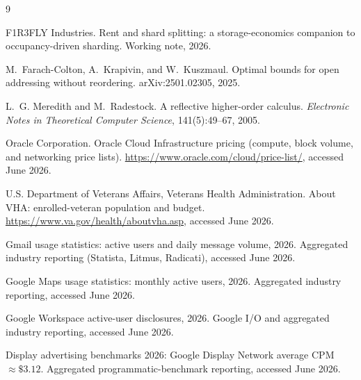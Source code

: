 \documentclass[11pt]{article}
\begin{document}
\begin{thebibliography}{9}

F1R3FLY Industries.
\newblock Rent and shard splitting: a storage-economics companion to occupancy-driven sharding.
\newblock Working note, 2026.

M.~Farach-Colton, A.~Krapivin, and W.~Kuszmaul.
\newblock Optimal bounds for open addressing without reordering.
\newblock arXiv:2501.02305, 2025.

L.~G. Meredith and M.~Radestock.
\newblock A reflective higher-order calculus.
\newblock \emph{Electronic Notes in Theoretical Computer Science}, 141(5):49--67, 2005.

Oracle Corporation.
\newblock Oracle Cloud Infrastructure pricing (compute, block volume, and networking price lists).
\newblock \url{https://www.oracle.com/cloud/price-list/}, accessed June 2026.

U.S. Department of Veterans Affairs, Veterans Health Administration.
\newblock About VHA: enrolled-veteran population and budget.
\newblock \url{https://www.va.gov/health/aboutvha.asp}, accessed June 2026.

Gmail usage statistics: active users and daily message volume, 2026.
\newblock Aggregated industry reporting (Statista, Litmus, Radicati), accessed June 2026.

Google Maps usage statistics: monthly active users, 2026.
\newblock Aggregated industry reporting, accessed June 2026.

Google Workspace active-user disclosures, 2026.
\newblock Google I/O and aggregated industry reporting, accessed June 2026.

Display advertising benchmarks 2026: Google Display Network average CPM ${\approx}\$3.12$.
\newblock Aggregated programmatic-benchmark reporting, accessed June 2026.

\end{thebibliography}
\end{document}

